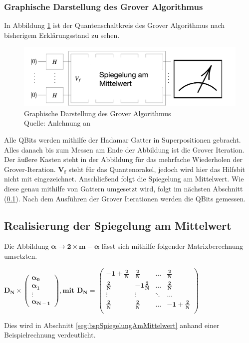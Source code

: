 \subsubsection{Graphische Darstellung des Grover Algorithmus}
In Abbildung \ref{fig:algoInformell} ist der Quantenschaltkreis des Grover Algorithmus nach bisherigem Erklärungsstand zu sehen.
\begin{figure}[hbtp]
	\centering
	\includegraphics[width=1\textwidth]{figures/algoInformell.png}
	\caption{Graphische Darstellung des Grover Algorithmus \\ Quelle: Anlehnung an \cite[S. 146]{Ho17}}
	\label{fig:algoInformell}
\end{figure}
Alle QBits werden mithilfe der Hadamar Gatter in Superpositionen gebracht. Alles danach bis zum Messen am Ende der Abbildung ist die Grover Iteration.
Der äußere Kasten steht in der Abbildung für das mehrfache Wiederholen der Grover-Iteration. $\mathbf{V_f}$ steht für das Quantenorakel, jedoch wird hier das Hilfsbit nicht mit eingezeichnet. Anschließend folgt die Spiegelung am Mittelwert. Wie diese genau mithilfe von Gattern umgesetzt wird, folgt im nächsten Abschnitt (\ref{sec:realiserung}). Nach dem Ausführen der Grover Iterationen werden die QBits gemessen.
\subsection{Realisierung der Spiegelung am Mittelwert}
\label{sec:realiserung}
Die Abbildung $\mathbf{\alpha \rightarrow 2 \times m - \alpha}$ lässt sich mithilfe folgender Matrixberechnung umsetzten.
\begin{center}
	$\mathbf{D_N \times 
	\begin{pmatrix}
			\alpha_0 \\ \alpha_1 \\ \vdots \\  \alpha_{N-1}
	\end{pmatrix}, \text{mit } D_N = 
	\begin{pmatrix}
			-1 + \frac{2}{N} & \frac{2}{N} & \dots& \frac{2}{N} \\
			\frac{2}{N} & -1 \frac{2}{N} & \dots& \frac{2}{N} \\
			\vdots & \vdots & \ddots& \dots \\
			 \frac{2}{N} & \frac{2}{N} & \dots& -1+ \frac{2}{N} \\
	\end{pmatrix}}$
\end{center}
Dies wird in Abschnitt \ref{seg:bspSpiegelungAmMittelwert} anhand einer Beispielrechnung verdeutlicht.

